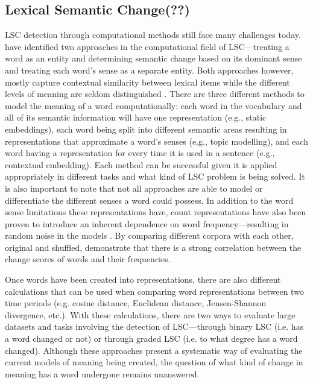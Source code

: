 \subsection{Lexical Semantic Change(??)}

LSC detection through computational methods still face many challenges today. \citet{hengchen2021challenges} have identified two approaches in the computational field of LSC—treating a word as an entity and determining semantic change based on its dominant sense and treating each word’s sense as a separate entity. Both approaches however, mostly capture contextual similarity between lexical items while the different levels of meaning are seldom distinguished \citep{hengchen2021challenges}. There are three different methods to model the meaning of a word computationally: each word in the vocabulary and all of its semantic information will have one representation (e.g., static embeddings), each word being split into different semantic areas resulting in representations that approximate a word’s senses (e.g., topic modelling), and each word having a representation for every time it is used in a sentence (e.g., contextual embedding). Each method can be successful given it is applied appropriately in different tasks and what kind of LSC problem is being solved. It is also important to note that not all approaches are able to model or differentiate the different senses a word could possess. In addition to the word sense limitations these representations have, count representations have also been proven to introduce an inherent dependence on word frequency—resulting in random noise in the models \citep{dubossarsky-etal-2017-outta}. By comparing different corpora with each other, original and shuffled, \citet{dubossarsky-etal-2017-outta} demonstrate that there is a strong correlation between the change scores of words and their frequencies. 

Once words have been created into representations, there are also different calculations that can be used when comparing word representations between two time periods (e.g. cosine distance, Euclidean distance, Jensen-Shannon divergence, etc.). With these calculations, there are two ways to evaluate large datasets and tasks involving the detection of LSC—through binary LSC (i.e. has a word changed or not) or through graded LSC (i.e. to what degree has a word changed). Although these approaches present a systematic way of evaluating the current models of meaning being created, the question of what kind of change in meaning has a word undergone remains unanswered.

